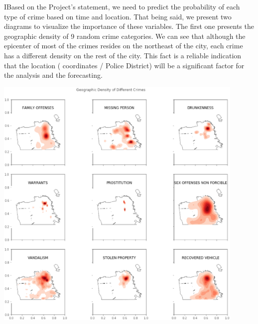 IBased on the Project’s statement, we need to predict the probability of each type of crime
 based on time and location. 
That being said, we present two diagrams to visualize the importance of these variables. 
The first one presents the geographic density of 9 random crime categories. We can see that 
although the epicenter of most of the crimes resides on the northeast of the city, each crime 
has a different density on the rest of the city. This fact is a reliable indication that the
 location ( coordinates / Police District) will be a significant factor for the analysis and
  the forecasting.
\begin{center}

  \begin{minipage}{0.7\linewidth}
  \centering

  \includegraphics[width=0.9\textwidth]{kaggle/11.1.eps}

  \end{minipage}
\end{center}


